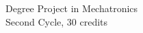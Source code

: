 \begin{titlepage}
    \begin{flushleft}
    \fontsize{14}{13}\upshape Degree Project in Mechatronics \\
    \vspace{8pt}
    \upshape Second Cycle, 30 credits ~\\
    \vspace{40pt}
    {\fontsize{25}{20}\bf\sffamily\@title\\}
    \vspace{30pt}
    {\fontsize{20}{18}\sffamily \@author\\}
    \end{flushleft}
    

\end{titlepage}
